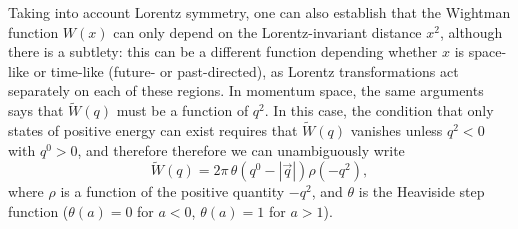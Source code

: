 \documentclass[a4paper,12pt]{article}
\numberwithin{equation}{section}
\begin{document}
Taking into account Lorentz symmetry, one can also establish that the Wightman function $W(x)$ can only depend on the Lorentz-invariant distance $x^2$, although there is a subtlety: this can be a different function depending whether $x$ is space-like or time-like (future- or past-directed), as Lorentz transformations act separately on each of these regions.
In momentum space, the same arguments says that $\widetilde{W}(q)$ must be a function of $q^2$. In this case, the condition that only states of positive energy can exist requires that $\widetilde{W}(q)$ vanishes unless $q^2 < 0$ with $q^0 > 0$, and therefore therefore we can unambiguously write
\begin{equation}
	\widetilde{W}(q)
	= 2\pi \, \theta\left( q^0 - \left| \vec{q} \right| \right)
	\rho(-q^2),
	\label{eq:spectraldensity}
\end{equation}
where $\rho$ is a function of the positive quantity $-q^2$, and $\theta$ is the Heaviside step function ($\theta(a) = 0$ for $a < 0$, $\theta(a) = 1$ for $a > 1$).
\end{document}
